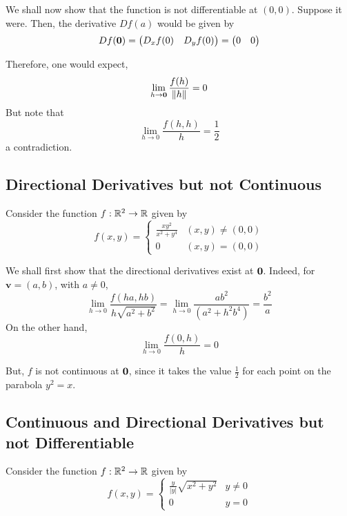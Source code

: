 We shall now show that the function is not differentiable at $(0,0)$. Suppose it were. Then, the derivative $Df(a)$ would be given by 
\begin{equation*}
    Df(\mathbf{0}) = \begin{pmatrix} D_xf(0) & D_yf(0)\end{pmatrix} = \begin{pmatrix}0 & 0\end{pmatrix}
\end{equation*}

Therefore, one would expect,
\begin{equation*}
    \lim_{h\to\mathbf{0}}\frac{f(h)}{\|h\|} = 0
\end{equation*}
But note that 
\begin{equation*}
    \lim_{h\to 0}\frac{f(h,h)}{h} = \frac{1}{2}
\end{equation*}
a contradiction. 

\subsection*{Directional Derivatives but not Continuous}
Consider the function $f:\mathbb{R}^2\to\mathbb{R}$ given by 
\begin{equation*}
    f(x,y) = 
    \begin{cases}
        \frac{xy^2}{x^2 + y^4} & (x,y)\ne(0,0)\\
        0 & (x,y) = (0,0)
    \end{cases}
\end{equation*}

We shall first show that the directional derivatives exist at $\mathbf{0}$. Indeed, for $\mathbf{v} = (a,b)$, with $a\ne 0$,
\begin{equation*}
    \lim_{h\to0}\frac{f(ha,hb)}{h\sqrt{a^2 + b^2}} = \lim_{h\to0}\frac{ab^2}{(a^2 + h^2b^4)} = \frac{b^2}{a}
\end{equation*}
On the other hand,
\begin{equation*}
    \lim_{h\to0}\frac{f(0,h)}{h} = 0
\end{equation*}

But, $f$ is not continuous at $\mathbf{0}$, since it takes the value $\frac{1}{2}$ for each point on the parabola $y^2 = x$.

\subsection*{Continuous and Directional Derivatives but not Differentiable}
Consider the function $f:\mathbb{R}^2\to\mathbb{R}$ given by 
\begin{equation*}
    f(x,y) = 
    \begin{cases}
        \frac{y}{|y|}\sqrt{x^2 + y^2} & y\ne 0\\
        0 & y = 0
    \end{cases}
\end{equation*}

